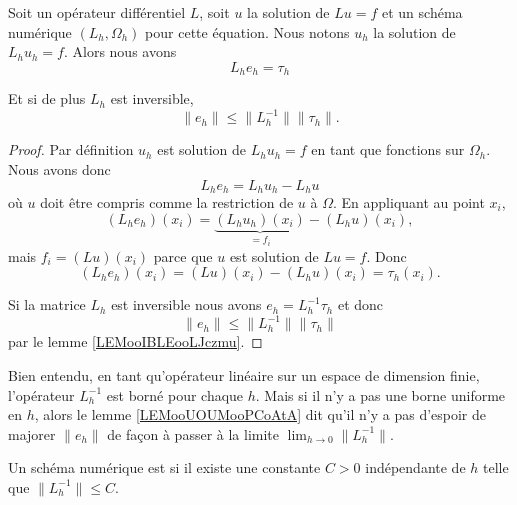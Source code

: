 \begin{lemma}       \label{LEMooUOUMooPCoAtA}
    Soit un opérateur différentiel \( L\), soit \( u\) la solution de \( Lu=f\) et un schéma numérique \( (L_h,\Omega_h)\) pour cette équation. Nous notons \( u_h\) la solution de \( L_hu_h=f\). Alors nous avons
    \begin{equation}
        L_he_h=\tau_h
    \end{equation}

    Et si de plus \( L_h\) est inversible,
    \begin{equation}
        \| e_h \|\leq \| L_h^{-1} \|\| \tau_h \|.
    \end{equation}
\end{lemma}

\begin{proof}
    Par définition \( u_h\) est solution de \( L_hu_h=f\) en tant que fonctions sur \( \Omega_h\). Nous avons donc
    \begin{equation}
        L_he_h=L_hu_h-L_hu
    \end{equation}
    où \( u\) doit être compris comme la restriction de \( u\) à \( \Omega\). En appliquant au point \( x_i\),
    \begin{equation}
        (L_he_h)(x_i)=\underbrace{(L_hu_h)(x_i)}_{=f_i}-(L_hu)(x_i),
    \end{equation}
    mais \( f_i=(Lu)(x_i)\) parce que \( u\) est solution de \( Lu=f\). Donc
    \begin{equation}
        (L_he_h)(x_i)=(Lu)(x_i)-(L_hu)(x_i)=\tau_h(x_i).
    \end{equation}

    Si la matrice \( L_h\) est inversible nous avons \( e_h=L_h^{-1}\tau_h\) et donc
    \begin{equation}
        \| e_h \|\leq \| L_h^{-1} \|\| \tau_h \|
    \end{equation}
    par le lemme \ref{LEMooIBLEooLJczmu}.
\end{proof}

Bien entendu, en tant qu'opérateur linéaire sur un espace de dimension finie, l'opérateur \( L_h^{-1}\) est borné pour chaque \( h\). Mais si il n'y a pas une borne uniforme en \( h\), alors le lemme \ref{LEMooUOUMooPCoAtA} dit qu'il n'y a pas d'espoir de majorer \( \| e_h \|\) de façon à passer à la limite \( \lim_{h\to 0} \| L_h^{-1} \|\).

\begin{definition}
    Un schéma numérique est  si il existe une constante \( C>0\) indépendante de \( h\) telle que \( \| L_h^{-1} \|\leq C\).
\end{definition}

